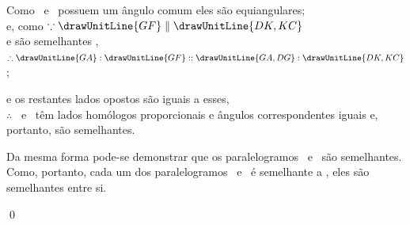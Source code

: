 \documentclass[booklanguage=brazilian]{byrnebook}
\begin{document}
\begin{center}
Como \parallelogramABCD\ e \parallelogramAEFG\ possuem um ângulo comum eles são equiangulares;\\
e, como $\because \drawUnitLine{GF} \parallel \drawUnitLine{DK,KC}$\\ %
e
são semelhantes ,\\
$\therefore \drawUnitLine{GA} : \drawUnitLine{GF} :: \drawUnitLine{GA,DG} : \drawUnitLine{DK,KC}$;

e os restantes lados opostos são iguais a esses,\\
$\therefore$ \parallelogramAEFG\ e \parallelogramABCD\ têm lados homólogos proporcionais e ângulos correspondentes iguais e, portanto, são semelhantes.

Da mesma forma pode-se demonstrar que os paralelogramos \parallelogramABCD\ e \parallelogramFHCK\ são semelhantes.\\
Como, portanto, cada um dos paralelogramos \parallelogramAEFG\ e \parallelogramFHCK\ é semelhante a \parallelogramABCD, eles são semelhantes entre si.
\end{center}

\qed
\end{document}
